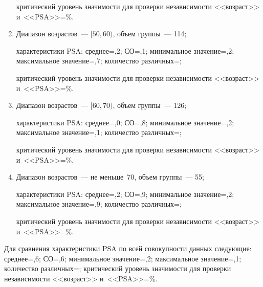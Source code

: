 \begin{multicols}{2}
\begin{enumerate}[1.]
     критический уровень значимости для проверки независимости
     <<возраст>> и~<<PSA>>\;=\%.
\item Диапазон возрастов~--- $[50,60)$, объем группы~--- 114;

характеристики PSA: сред\-нее\;=,2; СО\;=,1; минимальное зна\-че\-ние\;=,2;
максимальное зна\-че\-ние\;=,7; количество раз\-лич\-ных\;=;

     критический уровень значимости для проверки независимости <<возраст>>
     и~<<PSA>>\;=\%.
\item Диапазон возрастов~--- $[60,70)$, объем группы~--- 126;

характеристики PSA: сред\-нее\;=,0; СО\;=,8; минимальное зна\-че\-ние\;=,2;
максимальное зна\-че\-ние\;=,1; количество раз\-лич\-ных\;=;

     критический уровень значимости для проверки независимости <<возраст>> и~<<PSA>>\;=\%.
\item Диапазон возрастов~--- не меньше~70, объем группы~--- 55;

характеристики PSA: сред\-нее\;=,2; СО\;=,9; минимальное зна\-че\-ние\;=,2;
максимальное зна\-че\-ние\;=,9; количество раз\-лич\-ных\;=;

     критический уровень значимости для проверки независимости <<возраст>> и~<<PSA>>\;=\%.
     \end{enumerate}

     Для сравнения характеристики PSA по всей совокупности данных
следующие: сред\-нее\;=,6; СО\;=,6; минимальное зна\-че\-ние\;=,2; максимальное
зна\-че\-ние\;=,1; количество раз\-лич\-ных\;=;
критический уровень значимости для проверки
независимости <<возраст>> и~<<PSA>>\;=\%.

\begin{table*}\small %
\begin{center}
\parbox{310pt}{

}

\vspace*{2ex}


\end{center}
\end{table*}
\end{multicols}

